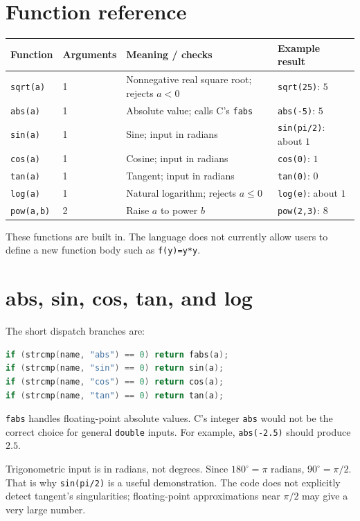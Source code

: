\documentclass[11pt,a4paper]{report}
\begin{document}
\section{Function reference}
\begin{center}
\small
\begin{tabularx}{\textwidth}{@{}llXX@{}}
\toprule
Function & Arguments & Meaning / checks & Example result\\
\midrule
\texttt{sqrt(a)} & 1 & Nonnegative real square root; rejects $a<0$ & \texttt{sqrt(25)}: $5$\\
\texttt{abs(a)} & 1 & Absolute value; calls C's \texttt{fabs} & \texttt{abs(-5)}: $5$\\
\texttt{sin(a)} & 1 & Sine; input in radians & \texttt{sin(pi/2)}: about $1$\\
\texttt{cos(a)} & 1 & Cosine; input in radians & \texttt{cos(0)}: $1$\\
\texttt{tan(a)} & 1 & Tangent; input in radians & \texttt{tan(0)}: $0$\\
\texttt{log(a)} & 1 & Natural logarithm; rejects $a\leq0$ & \texttt{log(e)}: about $1$\\
\texttt{pow(a,b)} & 2 & Raise $a$ to power $b$ & \texttt{pow(2,3)}: $8$\\
\bottomrule
\end{tabularx}
\end{center}
These functions are built in. The language does not currently allow users
to define a new function body such as \texttt{f(y)=y*y}.

\section{abs, sin, cos, tan, and log}
The short dispatch branches are:
\begin{lstlisting}[language=C]
if (strcmp(name, "abs") == 0) return fabs(a);
if (strcmp(name, "sin") == 0) return sin(a);
if (strcmp(name, "cos") == 0) return cos(a);
if (strcmp(name, "tan") == 0) return tan(a);
\end{lstlisting}
\texttt{fabs} handles floating-point absolute values. C's integer
\texttt{abs} would not be the correct choice for general \texttt{double} inputs.
For example, \texttt{abs(-2.5)} should produce $2.5$.

Trigonometric input is in radians, not degrees. Since $180^\circ=\pi$ radians,
$90^\circ=\pi/2$. That is why \texttt{sin(pi/2)} is a useful demonstration.
The code does not explicitly detect tangent's singularities; floating-point
approximations near $\pi/2$ may give a very large number.
\end{document}
